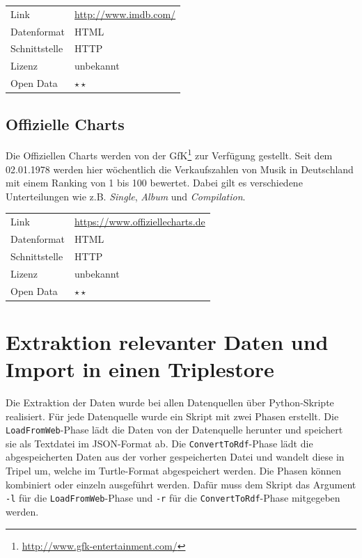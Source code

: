 \documentclass[parskip]{scrartcl}
\begin{document}
\begin{tabular}{l|p{9cm}}
	Link & \url{http://www.imdb.com/} \\
 	Datenformat & HTML \\
 	Schnittstelle & HTTP \\
 	Lizenz & unbekannt \\
 	Open Data & $\star\star$ \\
\end{tabular}

\subsection{Offizielle Charts}

Die Offiziellen Charts werden von der GfK\footnote{\href{http://www.gfk-entertainment.com/}{http://www.gfk-entertainment.com/}} zur Verfügung gestellt. Seit dem 02.01.1978 werden hier wöchentlich die Verkaufszahlen von Musik in Deutschland mit einem Ranking von 1 bis 100 bewertet. Dabei gilt es verschiedene Unterteilungen wie z.B. \textit{Single}, \textit{Album} und \textit{Compilation}.

\begin{tabular}{l|p{9cm}}
    Link & \url{https://www.offiziellecharts.de} \\
    Datenformat & HTML \\
    Schnittstelle & HTTP \\
    Lizenz & unbekannt \\
    Open Data & $\star\star$ \\
\end{tabular}

\section{Extraktion relevanter Daten und Import in einen Triplestore }

Die Extraktion der Daten wurde bei allen Datenquellen über Python-Skripte realisiert. Für jede Datenquelle wurde ein Skript mit zwei Phasen erstellt. Die \texttt{LoadFromWeb}-Phase lädt die Daten von der Datenquelle herunter und speichert sie als Textdatei im JSON-Format ab. Die \texttt{ConvertToRdf}-Phase lädt die abgespeicherten Daten aus der vorher gespeicherten Datei und wandelt diese in Tripel um, welche im Turtle-Format abgespeichert werden. Die Phasen können kombiniert oder einzeln ausgeführt werden. Dafür muss dem Skript das Argument \texttt{-l} für die \texttt{LoadFromWeb}-Phase und \texttt{-r} für die \texttt{ConvertToRdf}-Phase mitgegeben werden.
\end{document}
